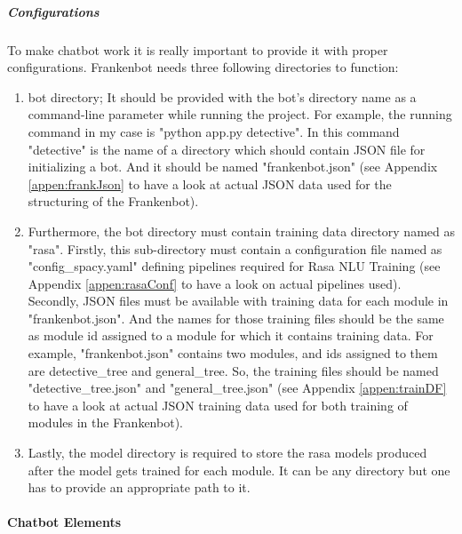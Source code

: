 \subparagraph*{Configurations \label{par:config}}
To make chatbot work it is really important to provide it with proper configurations. Frankenbot needs three following directories to function:
\begin{enumerate}
    \item bot directory; It should be provided with the bot's directory name as a command-line parameter while running the project. For example, the running command in my case is "python app.py detective". In this command "detective" is the name of a directory which should contain JSON file for initializing a bot. And it should be named "frankenbot.json" (see Appendix \ref{appen:frankJson} to have a look at actual JSON data used for the structuring of the Frankenbot). 
    \item Furthermore, the bot directory must contain training data directory named as "rasa". Firstly, this sub-directory must contain a configuration file named as "config\_spacy.yaml" defining pipelines required for Rasa NLU Training\cite{rasapipeline} (see Appendix \ref{appen:rasaConf} to have a look on actual pipelines used). Secondly, JSON files must be available with training data for each module in "frankenbot.json". And the names for those training files should be the same as module id assigned to a module for which it contains training data. For example, "frankenbot.json" contains two modules, and ids assigned to them are detective\_tree and general\_tree. So, the training files should be named "detective\_tree.json" and "general\_tree.json" (see Appendix \ref{appen:trainDF} to have a look at actual JSON training data used for both training of modules in the Frankenbot).
    \item Lastly, the model directory is required to store the rasa models produced after the model gets trained for each module. It can be any directory but one has to provide an appropriate path to it.
\end{enumerate} 

\paragraph*{Chatbot Elements}

